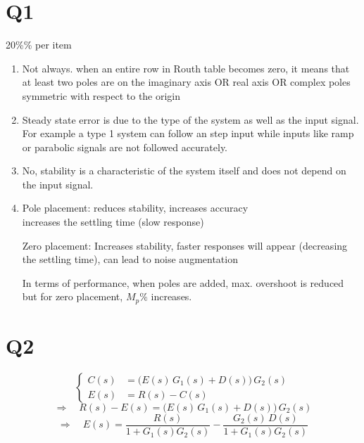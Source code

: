 \documentclass[11pt,a4paper]{article}
\begin{document}

\section{Q1}
\textcolor{kirmizikalem}{20\%\% per item}

\begin{enumerate}[label=\alph*)]
\item Not always. when an entire row in Routh table becomes zero, it means that at least two poles are on the imaginary axis OR real axis OR complex poles symmetric with respect to the origin
\begin{center}
\end{center}
\item Steady state error is due to the type of the system as well as the input signal. For example a type 1 system can follow an step input while inputs like ramp or parabolic signals are not followed accurately.
\item No, stability is a characteristic of the system itself and does not depend on the input signal.
\item Pole placement: reduces stability, increases accuracy \\
increases the settling time (slow response)

Zero placement: Increases stability, faster responses will appear (decreasing the settling time), can lead to noise augmentation

In terms of performance, when poles are added, max. overshoot is reduced but for zero placement, $M_p\%$ increases.
\end{enumerate}

\section{Q2}
\[
\left\{\begin{aligned}
C(s) &= \bigl(E(s)\,G_1(s)+D(s)\bigr)\,G_2(s)\\
E(s) &= R(s)-C(s)
\end{aligned}\right.
\]
\[
\Rightarrow\quad R(s)-E(s)=\bigl(E(s)\,G_1(s)+D(s)\bigr)\,G_2(s)
\]
\[
\Rightarrow\quad E(s)=\frac{R(s)}{1+G_1(s)G_2(s)}-\frac{G_2(s)\,D(s)}{1+G_1(s)G_2(s)}
\]
\end{document}
